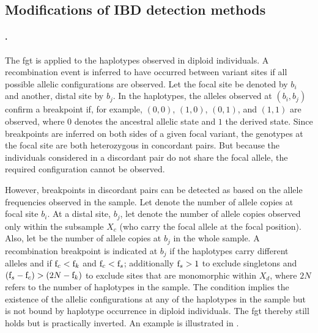 %
\subsection{Modifications of IBD detection methods}
%

\paragraph{.}
The \gls{fgt} is applied to the  haplotypes observed in  diploid individuals.
A recombination event is inferred to have occurred between  variant sites if all  possible allelic configurations are observed.
Let the focal site be denoted by $b_i$ and another, distal site by $b_j$.
In the  haplotypes, the alleles observed at ${(b_i,b_j)}$ confirm a breakpoint if, for example, ${(0,0)}$, ${(1,0)}$, ${(0,1)}$, and ${(1,1)}$ are observed, where $0$ denotes the ancestral allelic state and $1$ the derived state.
Since breakpoints are inferred on both sides of a given focal variant, the genotypes at the focal site are both heterozygous in concordant pairs.
But because the  individuals considered in a discordant pair do not share the focal allele, the required configuration cannot be observed.

%

%

However, breakpoints in discordant pairs can be detected as based on the allele frequencies observed in the sample.
Let \fk{} denote the number of allele copies at focal site $b_i$.
At a distal site, $b_j$, let  denote the number of allele copies observed only within the subsample $X_c$ (who carry the focal allele at the focal position).
Also, let  be the number of allele copies at $b_j$ in the whole sample.
A recombination breakpoint is indicated at $b_j$ if the  haplotypes carry different alleles and if ${\fk{c} < \fk{}}$ and ${\fk{c} < \fk{s}}$; additionally ${\fk{s} > 1}$ to exclude singletons and ${(\fk{s} - \fk{c}) > (2N - \fk{})}$ to exclude sites that are monomorphic within $X_d$, where $2N$ refers to the number of haplotypes in the sample.
The condition implies the existence of the  allelic configurations at any of the haplotypes in the sample but is not bound by haplotype occurrence in  diploid individuals.
The \gls{fgt} thereby still holds but is practically inverted.
An example is illustrated in .


